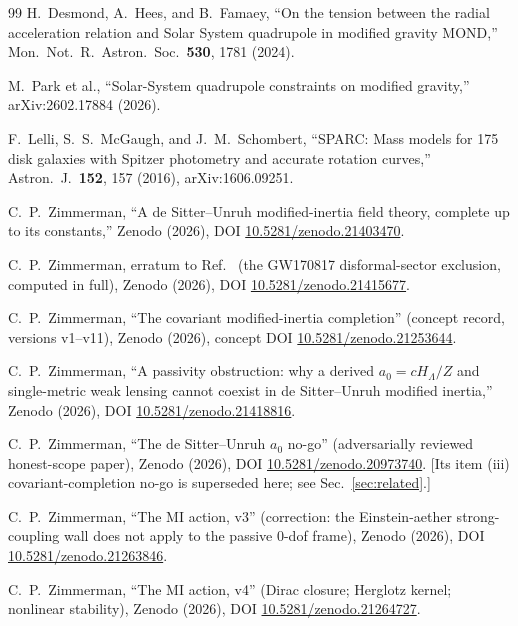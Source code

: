 \documentclass[11pt]{article}
\begin{document}
\begin{thebibliography}{99}
 H.\ Desmond, A.\ Hees, and B.\ Famaey, ``On the tension between the radial acceleration relation and Solar System quadrupole in modified gravity MOND,'' Mon.\ Not.\ R.\ Astron.\ Soc.\ \textbf{530}, 1781 (2024).

 M.\ Park et al., ``Solar-System quadrupole constraints on modified gravity,'' arXiv:2602.17884 (2026).

 F.\ Lelli, S.\ S.\ McGaugh, and J.\ M.\ Schombert, ``SPARC: Mass models for 175 disk galaxies with Spitzer photometry and accurate rotation curves,'' Astron.\ J.\ \textbf{152}, 157 (2016), arXiv:1606.09251.

 C.\ P.\ Zimmerman, ``A de Sitter--Unruh modified-inertia field theory, complete up to its constants,'' Zenodo (2026), DOI \href{https://doi.org/10.5281/zenodo.21403470}{10.5281/zenodo.21403470}.

 C.\ P.\ Zimmerman, erratum to Ref.~\cite{zft} (the GW170817 disformal-sector exclusion, computed in full), Zenodo (2026), DOI \href{https://doi.org/10.5281/zenodo.21415677}{10.5281/zenodo.21415677}.

 C.\ P.\ Zimmerman, ``The covariant modified-inertia completion'' (concept record, versions v1--v11), Zenodo (2026), concept DOI \href{https://doi.org/10.5281/zenodo.21253644}{10.5281/zenodo.21253644}.

 C.\ P.\ Zimmerman, ``A passivity obstruction: why a derived $a_0=cH_\Lambda/Z$ and single-metric weak lensing cannot coexist in de Sitter--Unruh modified inertia,'' Zenodo (2026), DOI \href{https://doi.org/10.5281/zenodo.21418816}{10.5281/zenodo.21418816}.

 C.\ P.\ Zimmerman, ``The de Sitter--Unruh $a_0$ no-go'' (adversarially reviewed honest-scope paper), Zenodo (2026), DOI \href{https://doi.org/10.5281/zenodo.20973740}{10.5281/zenodo.20973740}. [Its item (iii) covariant-completion no-go is superseded here; see Sec.~\ref{sec:related}.]

 C.\ P.\ Zimmerman, ``The MI action, v3'' (correction: the Einstein-aether strong-coupling wall does not apply to the passive 0-dof frame), Zenodo (2026), DOI \href{https://doi.org/10.5281/zenodo.21263846}{10.5281/zenodo.21263846}.

 C.\ P.\ Zimmerman, ``The MI action, v4'' (Dirac closure; Herglotz kernel; nonlinear stability), Zenodo (2026), DOI \href{https://doi.org/10.5281/zenodo.21264727}{10.5281/zenodo.21264727}.


\end{thebibliography}
\end{document}

